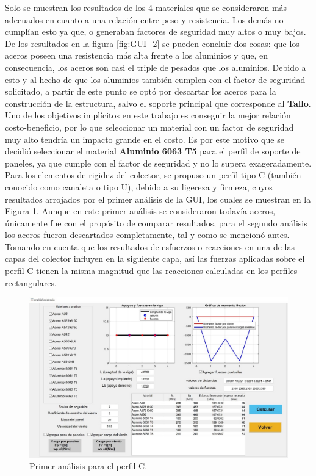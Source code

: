 Solo se muestran los resultados de los 4 materiales que se consideraron más adecuados en cuanto a una relación entre peso y resistencia. Los demás no cumplían esto ya que, o generaban factores de seguridad muy altos o muy bajos. De los resultados en la figura \ref{fig:GUI_2} se pueden concluir dos cosas: que los aceros poseen una resistencia más alta frente a los aluminios y que, en consecuencia, los aceros son casi el triple de pesados que los aluminios. Debido a esto y al hecho de que los aluminios también cumplen con el factor de seguridad solicitado, a partir de este punto se optó por descartar los aceros para la construcción de la estructura, salvo el soporte principal que corresponde al \textbf{Tallo}.\\

Uno de los objetivos implícitos en este trabajo es conseguir la mejor relación costo-beneficio, por lo que seleccionar un material con un factor de seguridad muy alto tendría un impacto grande en el costo. Es por este motivo que se decidió seleccionar el material \textbf{Aluminio 6063 T5} para el perfil de soporte de paneles, ya que cumple con el factor de seguridad y no lo supera exageradamente.\\

\newpage
Para los elementos de rigidez del colector, se propuso un perfil tipo C (también conocido como canaleta o tipo U), debido a su ligereza y firmeza, cuyos resultados arrojados por el primer análisis de la GUI, los cuales se muestran en la Figura \ref{fig:GUI_3}. Aunque en este primer análisis se consideraron todavía aceros, únicamente fue con el propósito de comparar resultados, para el segundo análisis los aceros fueron descartados completamente, tal y como se mencionó antes.\\

Tomando en cuenta que los resultados de esfuerzos o reacciones en una de las capas del colector influyen en la siguiente capa, así las fuerzas aplicadas sobre el perfil C tienen la misma magnitud que las reacciones calculadas en los perfiles rectangulares.
\begin{figure}[H]
	\centering
	\includegraphics[width=\columnwidth]{imagenes/GUI_3}
	\caption{Primer análisis para el perfil C.}
	\label{fig:GUI_3}
\end{figure}

